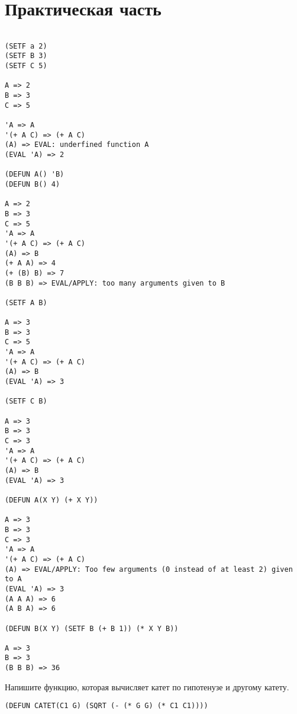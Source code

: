 \section{Практическая часть}

\begin{lstlisting}

(SETF a 2) 
(SETF B 3) 
(SETF C 5)

A => 2
B => 3
C => 5

'A => A
'(+ A C) => (+ A C)
(A) => EVAL: underfined function A
(EVAL 'A) => 2

(DEFUN A() 'B)
(DEFUN B() 4)

A => 2
B => 3
C => 5
'A => A
'(+ A C) => (+ A C)
(A) => B
(+ A A) => 4
(+ (B) B) => 7
(B B B) => EVAL/APPLY: too many arguments given to B

(SETF A B)

A => 3
B => 3
C => 5
'A => A
'(+ A C) => (+ A C)
(A) => B
(EVAL 'A) => 3

(SETF C B)

A => 3
B => 3
C => 3
'A => A
'(+ A C) => (+ A C)
(A) => B
(EVAL 'A) => 3

(DEFUN A(X Y) (+ X Y))

A => 3
B => 3
C => 3
'A => A
'(+ A C) => (+ A C)
(A) => EVAL/APPLY: Too few arguments (0 instead of at least 2) given to A
(EVAL 'A) => 3
(A A A) => 6
(A B A) => 6

(DEFUN B(X Y) (SETF B (+ B 1)) (* X Y B))

A => 3
B => 3
(B B B) => 36 
\end{lstlisting}

Напишите функцию, которая вычисляет катет по гипотенузе и другому катету.

\begin{lstlisting}
(DEFUN CATET(C1 G) (SQRT (- (* G G) (* C1 C1))))
\end{lstlisting}